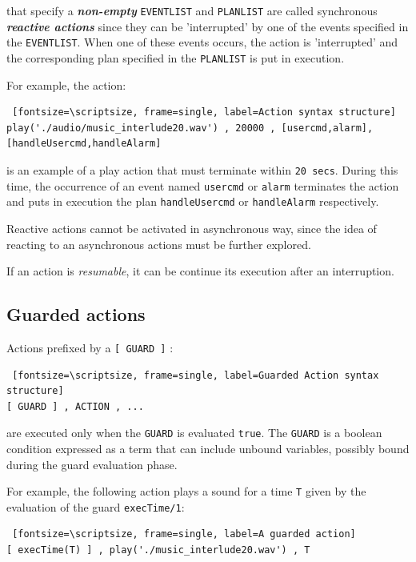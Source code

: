 that specify  a \textit{\textbf{non-empty}} \texttt{EVENTLIST} and \texttt{PLANLIST} are called synchronous \textbf{\textit{reactive actions}} since they can be 'interrupted' by one of the events specified in the \texttt{EVENTLIST}. When one of these events occurs, the action is 'interrupted' and the corresponding plan specified in the \texttt{PLANLIST} is put in execution.

For example, the action:
\begin{Verbatim} [fontsize=\scriptsize, frame=single, label=Action syntax structure]
play('./audio/music_interlude20.wav') , 20000 , [usercmd,alarm], [handleUsercmd,handleAlarm]
\end{Verbatim}
is an example of a play action that must terminate within \texttt{20 secs}. During this time, the occurrence of an event named \texttt{usercmd} or \texttt{alarm} terminates the action and puts in execution the plan \texttt{handleUsercmd} or \texttt{handleAlarm} respectively.

Reactive actions cannot be activated in asynchronous way, since the idea of reacting to an asynchronous actions must be further explored. 

If an  action is \textit{resumable}, it can be continue its execution after an interruption.
	


\subsection{Guarded actions}

Actions prefixed by a \texttt{[ GUARD ]} :
\begin{Verbatim} [fontsize=\scriptsize, frame=single, label=Guarded Action syntax structure]
[ GUARD ] , ACTION , ... 
\end{Verbatim}

are executed only when the \texttt{GUARD} is evaluated \texttt{true}. The \texttt{GUARD} is a boolean condition expressed as a \prolog{} term that can include unbound variables, possibly bound during the guard evaluation phase.

For example, the following action plays a sound for a time \texttt{T} given by the evaluation of the guard \texttt{execTime/1}:
 
\begin{Verbatim} [fontsize=\scriptsize, frame=single, label=A guarded action]		
[ execTime(T) ] , play('./music_interlude20.wav') , T  
\end{Verbatim}

